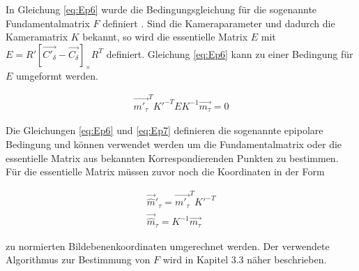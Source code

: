 In Gleichung \ref{eq:Ep6} wurde die Bedingungsgleichung für die sogenannte Fundamentalmatrix $F$ definiert \cite{Hoffmann}. Sind die Kameraparameter und dadurch die Kameramatrix $K$ bekannt, so wird die essentielle Matrix $E$  mit $E=R' \left[ \vec{C'_\delta}-\vec{C_\delta}\right]_\times R^T$ definiert. Gleichung \ref{eq:Ep6} kann zu einer Bedingung für $E$ umgeformt werden.

\begin{gather}
	\vec{m'_\tau}^TK'^{-T}EK^{-1}\vec{m_\tau} = 0\label{eq:Ep7}
\end{gather}

Die Gleichungen \ref{eq:Ep6} und \ref{eq:Ep7} definieren die sogenannte epipolare Bedingung\cite{HZ,Hoffmann} und können verwendet werden um die Fundamentalmatrix oder die essentielle Matrix aus bekannten Korrespondierenden Punkten zu bestimmen. Für die essentielle Matrix müssen zuvor noch die Koordinaten in der Form

\begin{gather}
	\vec{\hat{m}}'_\tau = \vec{m'_\tau}^TK'^{-T}\\
	\vec{\hat{m}}_\tau = K^{-1}\vec{m_\tau}\label{eq:equ8}
\end{gather}

zu normierten Bildebenenkoordinaten umgerechnet werden\cite{HZ,phdextrinsicPara}.  Der verwendete Algorithmus zur Bestimmung von $F$ wird in Kapitel 3.3 näher beschrieben.\\











